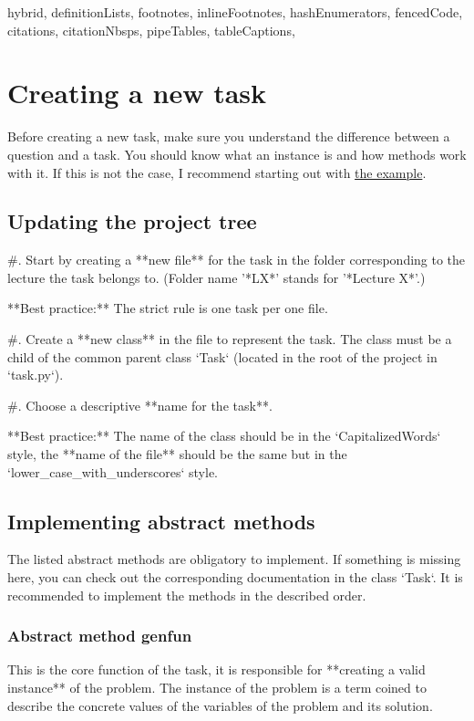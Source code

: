 \documentclass[
  digital, %
  table,   %
  twoside, %
  nolof,     %
  nolot,     %
  draft=false,
  final,
]{fithesis3}
\begin{document}
\begin{markdown*}{%
  hybrid,
  definitionLists,
  footnotes,
  inlineFootnotes,
  hashEnumerators,
  fencedCode,
  citations,
  citationNbsps,
  pipeTables,
  tableCaptions,
}
\section{Creating a new task}

Before creating a new task, make sure you understand the difference between a question and a task. You should know what an instance is and how methods work with it. If this is not the case, I recommend starting out with \hyperref[sec:example]{the example}. 

\subsection{Updating the project tree}

#. Start by creating a **new file** for the task in the folder corresponding to the lecture
the task belongs to. (Folder name '*LX*' stands for '*Lecture X*'.) 
\begin{shaded}{**Best practice:**}
    The strict rule is one task per one file.
\end{shaded}

#. Create a **new class** in the file to represent the task. The class must be a child of
the common parent class `Task` (located in the root of the project in `task.py`).

#. Choose a descriptive **name for the task**.
\begin{shaded}{**Best practice:**}
    The name of the class should be in the `CapitalizedWords` style, the **name of the file** should be the same but in the `lower_case_with_underscores` style.
\end{shaded}

\subsection{Implementing abstract methods}

The listed abstract methods are obligatory to implement. If something is missing here,
you can check out the corresponding documentation in the class `Task`. 
It is recommended to implement the methods in the described order.

\subsubsection{Abstract method genfun} 

This is the core function of the task, it is responsible for **creating a valid
instance** of the problem. The instance of the problem is a term coined to describe
the concrete values of the variables of the problem and its solution.


\end{markdown*}
\end{document}
